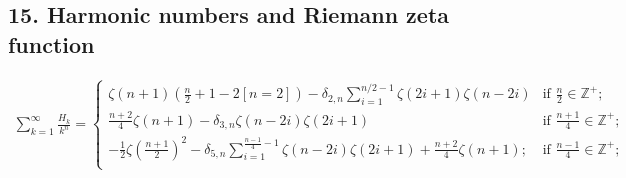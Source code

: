 \subsection{15. Harmonic numbers and Riemann zeta function}

\begin{align}
      \sum_{k=1}^\infty \frac{H_k}{k^n} = \left\{ \begin{array}{ll}
      \zeta(n+1)\left(\frac{n}{2} +1 - 2 [n=2]\right) - \delta_{2, n}
      \sum_{i=1}^{n/2-1} \zeta(2i+1) \zeta(n-2i) & \mbox{if $\frac{n}{2} 
      \in \mathbb{Z}^+ $};\\
      \frac{n+2}{4}\zeta(n+1)- \delta_{3, n} \zeta(n-2i)\zeta(2i+1)
      & \mbox{if $\frac{n+1}{4}\in \mathbb{Z}^+$}; \\
      -\frac{1}{2}\zeta\left(\frac{n+1}{2}\right)^2 - \delta_{5, n}
      \sum_{i=1}^{\frac{n-1}{4}-1}\zeta(n-2i)\zeta(2i+1) + 
      \frac{n+2}{4}\zeta(n+1); & \mbox{if $\frac{n-1}{4}\in 
      \mathbb{Z}^+$}; \\\end{array} \right.
\end{align}
